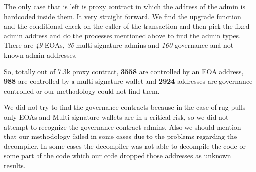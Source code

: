 
The only case that is left is proxy contract in which the address of the admin is hardcoded inside them. It very straight forward. We find the upgrade function and the conditional check on the caller of the transaction and then pick the fixed admin address and do the processes mentioned above to find the admin types. There are \textit{49} EOAs, \textit{36} multi-signature admins and \textit{160} governance and not known admin addresses. 



So, totally out of 7.3k proxy contract, \textbf{3558} are controlled by an EOA address, \textbf{988} are controlled by a multi signature wallet and \textbf{2924} addresses are governance controlled or our methodology could not find them.

We did not try to find the governance contracts because in the case of rug pulls only EOAs and Multi signature wallets are in a critical risk, so we did not attempt to recognize the governance contract admins. Also we should mention that our methodology failed in some cases due to the problems regarding the decompiler. In some cases the decompiler was not able to decompile the code or some part of the code which our code dropped those addresses as unknown results. 








